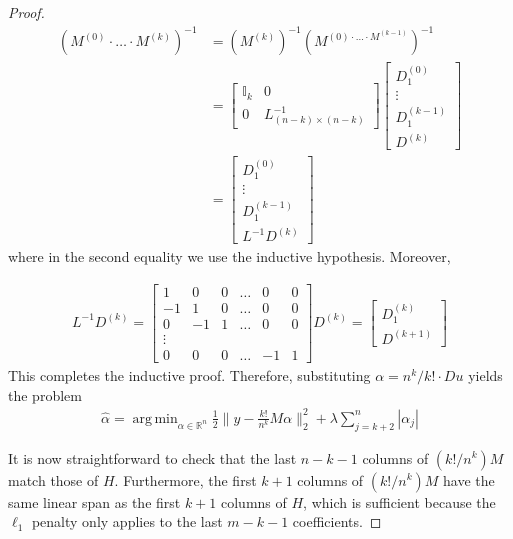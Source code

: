 \documentclass[a4paper]{article}
\DeclareMathOperator*{\argmin}{arg\,min}
\newcommand{\RR}{\mathbb{R}}
\begin{document}
\begin{proof}
\begin{align*}
(M^{(0)} \cdot \ldots \cdot M^{(k)})^{-1} &= (M^{(k)})^{-1} (M^{(0)\cdot\ldots\cdot M^{(k-1)}})^{-1}\\
&= 
\begin{bmatrix}
\mathbb{I}_k & 0\\
0 & L^{-1}_{(n-k)\times (n-k)}
\end{bmatrix}
\begin{bmatrix}
D_1^{(0)}\\
\vdots\\
D_1^{(k-1)}\\
D^{(k)}
\end{bmatrix}\\
&= 
\begin{bmatrix}
D_1^{(0)}\\
\vdots\\
D_1^{(k-1)}\\
L^{-1}D^{(k)}
\end{bmatrix}
\end{align*}
where in the second equality we use the inductive hypothesis. Moreover, 

\begin{align*}
L^{-1}D^{(k)} = 
\begin{bmatrix}
1 & 0 & 0 & \ldots & 0 & 0\\
-1 & 1 & 0 & \ldots & 0 & 0\\
0 & -1 & 1 & \ldots & 0 & 0\\
\vdots\\
0 & 0 & 0 & \ldots & -1 & 1
\end{bmatrix}
D^{(k)} = 
\begin{bmatrix}
D_1^{(k)}\\
D^{(k+1)}
\end{bmatrix}
\end{align*}
This completes the inductive proof. Therefore, substituting $\alpha = n^k/k!\cdot Du$ yields the problem
\begin{align*}
\hat{\alpha} = \argmin_{\alpha\in\RR^n} \frac{1}{2}\|y-\frac{k!}{n^k}M\alpha\|_2^2 + \lambda\sum_{j=k+2}^n|\alpha_j|
\end{align*}

It is now straightforward to check that the last $n-k-1$ columns of $(k!/n^k)M$ match those of $H$. Furthermore, the first $k+1$ columns of $(k!/n^k)M$ have the same linear span as the first $k+1$ columns of $H$, which is sufficient because the $\ell_1$ penalty only applies to the last $m-k-1$ coefficients. 
\end{proof}
\end{document}
